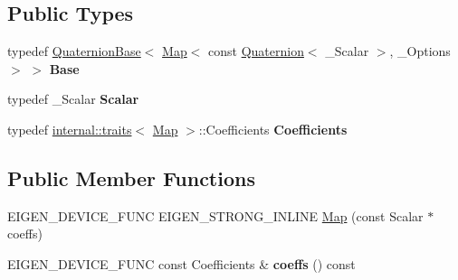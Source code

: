 \subsection*{Public Types}
\begin{DoxyCompactItemize}
\item 
\mbox{\label{class_eigen_1_1_map_3_01const_01_quaternion_3_01___scalar_01_4_00_01___options_01_4_a7c7b223e2358c7ebc6484c0cc0fd362d}} 
typedef \mbox{\hyperlink{class_eigen_1_1_quaternion_base}{Quaternion\+Base}}$<$ \mbox{\hyperlink{class_eigen_1_1_map}{Map}}$<$ const \mbox{\hyperlink{class_eigen_1_1_quaternion}{Quaternion}}$<$ \+\_\+\+Scalar $>$, \+\_\+\+Options $>$ $>$ {\bfseries Base}
\item 
\mbox{\label{class_eigen_1_1_map_3_01const_01_quaternion_3_01___scalar_01_4_00_01___options_01_4_ac091f6fe439476e54b14195628d8e6d1}} 
typedef \+\_\+\+Scalar {\bfseries Scalar}
\item 
\mbox{\label{class_eigen_1_1_map_3_01const_01_quaternion_3_01___scalar_01_4_00_01___options_01_4_ab06714dd3762f02398e9180e26f09d0f}} 
typedef \mbox{\hyperlink{struct_eigen_1_1internal_1_1traits}{internal\+::traits}}$<$ \mbox{\hyperlink{class_eigen_1_1_map}{Map}} $>$\+::Coefficients {\bfseries Coefficients}
\end{DoxyCompactItemize}
\subsection*{Public Member Functions}
\begin{DoxyCompactItemize}
\item 
E\+I\+G\+E\+N\+\_\+\+D\+E\+V\+I\+C\+E\+\_\+\+F\+U\+NC E\+I\+G\+E\+N\+\_\+\+S\+T\+R\+O\+N\+G\+\_\+\+I\+N\+L\+I\+NE \mbox{\hyperlink{class_eigen_1_1_map_3_01const_01_quaternion_3_01___scalar_01_4_00_01___options_01_4_a8b321eb2bf9a4e4b76465564e80f212b}{Map}} (const Scalar $\ast$coeffs)
\item 
\mbox{\label{class_eigen_1_1_map_3_01const_01_quaternion_3_01___scalar_01_4_00_01___options_01_4_a716c5a61df2bc2000de83d3f083ec450}} 
E\+I\+G\+E\+N\+\_\+\+D\+E\+V\+I\+C\+E\+\_\+\+F\+U\+NC const Coefficients \& {\bfseries coeffs} () const
\end{DoxyCompactItemize}
